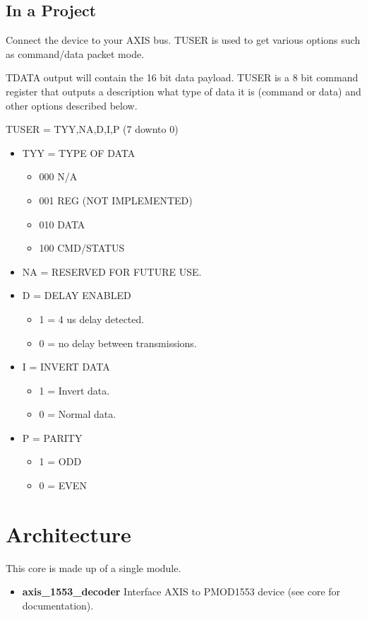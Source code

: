 

\subsection{In a Project}
\par
Connect the device to your AXIS bus. TUSER is used to get various options such as command/data packet mode.

\par
TDATA output will contain the 16 bit data payload. TUSER is a 8 bit command register
that outputs a description what type of data it is (command or data) and other options
described below.

TUSER = {TYY,NA,D,I,P} (7 downto 0)
\begin{itemize}
\item TYY = TYPE OF DATA
  \begin{itemize}
    \item 000 N/A
    \item 001 REG (NOT IMPLEMENTED)
    \item 010 DATA
    \item 100 CMD/STATUS
  \end{itemize}
  \item NA = RESERVED FOR FUTURE USE.
  \item D = DELAY ENABLED
  \begin{itemize}
    \item 1 = 4 us delay detected.
    \item 0 = no delay between transmissions.
  \end{itemize}
  \item I = INVERT DATA
  \begin{itemize}
    \item 1 = Invert data.
    \item 0 = Normal data.
  \end{itemize}
  \item P = PARITY
  \begin{itemize}
    \item 1 = ODD
    \item 0 = EVEN
  \end{itemize}
\end{itemize}

\section{Architecture}
\par
This core is made up of a single module.
\begin{itemize}
  \item \textbf{axis\_1553\_decoder} Interface AXIS to PMOD1553 device (see core for documentation).
\end{itemize}


